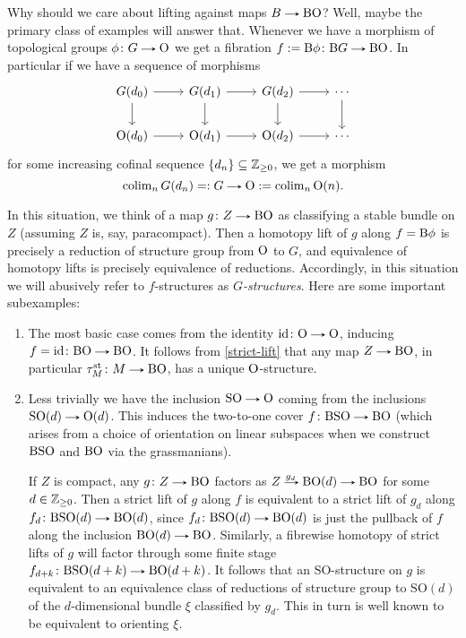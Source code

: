 \begin{examples}
  \label{f-examples}
  Why should we care about lifting against maps $B \to \B\O$? Well,
  maybe the primary class of examples will answer that. Whenever we
  have a morphism of topological groups $\phi \c G \to \O$ we get a
  fibration $f \ce \B\phi \c \B G \to \B\O$. In particular if we have
  a sequence of morphisms
  \[
  \begin{tikzcd}
    G(d_0) \ar[r] \ar[d] & G(d_1) \ar[r] \ar[d] & G(d_2) \ar[r] \ar[d]
    & \cdots \ar[d] \\ \O(d_0) \ar[r] & \O(d_1) \ar[r] & \O(d_2)
    \ar[r] & \cdots
  \end{tikzcd}
  \]
  for some increasing cofinal sequence $\{d_n\} \subseteq \mathbb{Z}_{\ge 0}$,
  we get a morphism
  \[
  \colim_n G(d_n) \ec G \to \O \ce \colim_n \O(n).
  \]
  
  In this situation, we think of a map $g \c Z \to \B\O$ as
  classifying a stable bundle on $Z$ (assuming $Z$ is, say,
  paracompact). Then a homotopy lift of $g$ along $f = \mathrm{B}\phi$ is
  precisely a reduction of structure group from $\mathrm{O}$ to $G$, and
  equivalence of homotopy lifts is precisely equivalence of
  reductions. Accordingly, in this situation we will abusively refer
  to $f$-structures as \emph{$G$-structures}. Here are some important
  subexamples:

  \newcommand{\SO}{\mathrm{SO}}
  \begin{enumerate}
  \item The most basic case comes from the identity $\id \c \O \to
    \O$, inducing $f = \id \c \B\O \to \B\O$. It follows from
    \eqref{strict-lift} that any map $Z \to \B\O$, in particular
    $\tau^\st_M \c M \to \B\O$, has a unique $\mathrm{O}$-structure.
  \item Less trivially we have the inclusion $\SO \to \O$ coming from
    the inclusions $\SO(d) \to \O(d)$. This induces the two-to-one
    cover $f \c \B\SO \to \B\O$ (which arises from a choice of
    orientation on linear subspaces when we construct $\B\SO$ and
    $\mathrm{B}\mathrm{O}$ via the grassmanians).

    If $Z$ is compact, any $g \c Z \to \B\O$ factors as $Z \lblto{g_d}
    \B\O(d) \to \B\O$ for some $d \in \mathbb{Z}_{\ge 0}$. Then a strict lift
    of $g$ along $f$ is equivalent to a strict lift of $g_d$ along
    $f_d \c \B\SO(d) \to \B\O(d)$, since $f_d \c \B\SO(d) \to \B\O(d)$
    is just the pullback of $f$ along the inclusion $\B\O(d) \to
    \B\O$. Similarly, a fibrewise homotopy of strict lifts of $g$ will
    factor through some finite stage $f_{d+k} \c \B\SO(d+k) \to
    \B\O(d+k)$. It follows that an $\SO$-structure on $g$ is
    equivalent to an equivalence class of reductions of structure
    group to $\SO(d)$ of the $d$-dimensional bundle $\xi$ classified
    by $g_d$. This in turn is well known to be equivalent to orienting
    $\xi$.


\end{enumerate}
\end{examples}
